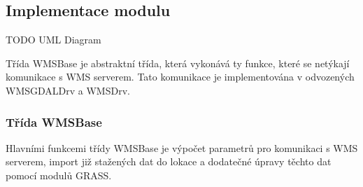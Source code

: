 \documentclass[a4paper,12pt]{article}
\begin{document}
\subsection{Implementace modulu}

TODO UML Diagram

Třída WMSBase je abstraktní třída, která vykonává ty funkce, které se
netýkají komunikace s WMS serverem. Tato komunikace je implementována
v odvozených WMSGDALDrv a WMSDrv.

\subsubsection{Třída WMSBase}


Hlavními funkcemi třídy WMSBase je výpočet parametrů pro komunikaci s
WMS serverem, import již stažených dat do lokace a dodatečné úpravy
těchto dat pomocí modulů GRASS.
\end{document}
